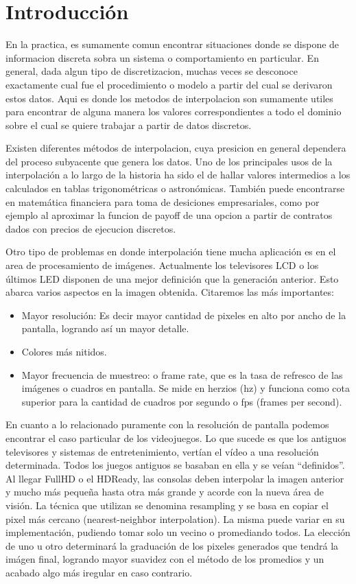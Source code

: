 \section{Introducción}

En la practica, es sumamente comun encontrar situaciones donde se dispone de informacion discreta sobra un sistema o comportamiento en particular. En general, dada algun tipo de discretizacion, muchas veces se desconoce exactamente cual fue el procedimiento o modelo a partir del cual se derivaron estos datos. Aqui es donde los metodos de interpolacion son sumamente utiles para encontrar de alguna manera los valores correspondientes a todo el dominio sobre el cual se quiere trabajar a partir de datos discretos.

Existen diferentes métodos de interpolacion, cuya presicion en general dependera del proceso subyacente que genera los datos. Uno de los principales usos de la interpolación a lo largo de la historia ha sido el de hallar valores intermedios a los calculados en tablas trigonométricas o astronómicas. También puede encontrarse en matemática financiera para toma de desiciones empresariales, como por ejemplo al aproximar la funcion de payoff de una opcion a  partir de contratos dados con precios de ejecucion discretos.

Otro tipo de problemas en donde interpolación tiene mucha aplicación es en el area de procesamiento de imágenes. 
Actualmente los televisores LCD o los últimos LED disponen de una mejor definición que la generación anterior. 
Esto abarca varios aspectos en la imagen obtenida. Citaremos las más importantes:
\begin{itemize}
	\item Mayor resolución: Es decir mayor cantidad de pixeles en alto por ancho de la pantalla, logrando así un mayor detalle.
	\item Colores más nitidos.
	\item Mayor frecuencia de muestreo: o frame rate, que es la tasa de refresco de las imágenes o cuadros en pantalla. Se mide en herzios (hz) y funciona como cota superior para la cantidad de cuadros por segundo o fps (frames per second).
\end{itemize}	

En cuanto a lo relacionado puramente con la resolución de pantalla podemos encontrar el caso particular de los videojuegos. 
Lo que sucede es que los antiguos televisores y sistemas de entretenimiento, vertían el vídeo a una resolución determinada. Todos los juegos antiguos se basaban en ella y se veían “definidos”. Al llegar FullHD o el HDReady, las consolas deben interpolar la imagen anterior y mucho más pequeña hasta otra más grande y acorde con la nueva área de visión. La técnica que utilizan se denomina resampling y se basa en copiar el pixel más cercano (nearest-neighbor interpolation). La misma puede variar en su implementación, pudiendo tomar solo un vecino o promediando todos. La elección de uno u otro determinará la graduación de los pixeles generados que tendrá la imágen final, logrando mayor suavidez con el método de los promedios y un acabado algo más iregular en caso contrario.


